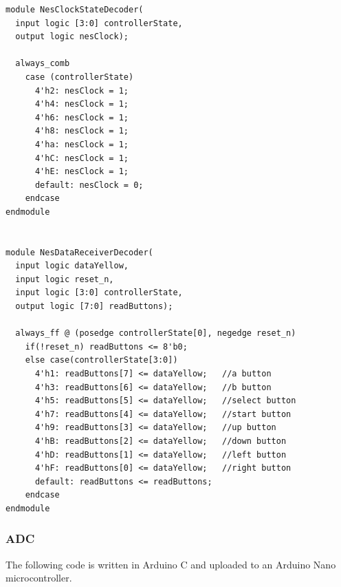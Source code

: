\documentclass[a4paper]{article}
\begin{document}
\begin{Verbatim}
module NesClockStateDecoder(
  input logic [3:0] controllerState,
  output logic nesClock);

  always_comb
    case (controllerState)
      4'h2: nesClock = 1;
      4'h4: nesClock = 1;
      4'h6: nesClock = 1;
      4'h8: nesClock = 1;
      4'ha: nesClock = 1;
      4'hC: nesClock = 1;
      4'hE: nesClock = 1;
      default: nesClock = 0;
    endcase
endmodule


module NesDataReceiverDecoder(
  input logic dataYellow,
  input logic reset_n,
  input logic [3:0] controllerState,
  output logic [7:0] readButtons); 

  always_ff @ (posedge controllerState[0], negedge reset_n)
    if(!reset_n) readButtons <= 8'b0;
    else case(controllerState[3:0])
      4'h1: readButtons[7] <= dataYellow;	//a button
      4'h3: readButtons[6] <= dataYellow;	//b button
      4'h5: readButtons[5] <= dataYellow;	//select button
      4'h7: readButtons[4] <= dataYellow;	//start button
      4'h9: readButtons[3] <= dataYellow;	//up button
      4'hB: readButtons[2] <= dataYellow;	//down button
      4'hD: readButtons[1] <= dataYellow;	//left button
      4'hF: readButtons[0] <= dataYellow;	//right button
      default: readButtons <= readButtons;
    endcase
endmodule
\end{Verbatim}

\subsubsection{ADC}
The following code is written in Arduino C and uploaded to an Arduino Nano microcontroller. 
\end{document}
